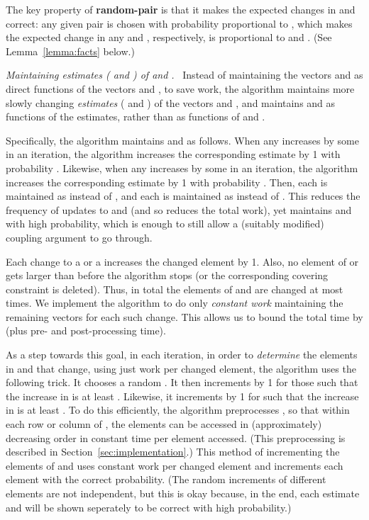 \documentclass[11pt]{svjour3} \usepackage{fullpage}
\renewcommand{\paragraph}[1]{\smallskip\vspace{2pt}\par{\em #1}~}
\begin{document}
The key property of {\bf random-pair} is that it makes
the expected changes in  and  correct:
any given pair  is chosen with probability proportional to
,
which makes the expected change in any  and ,
respectively, is proportional to  and .
(See Lemma~\ref{lemma:facts} below.)

\paragraph{Maintaining estimates ( and ) of  and .}
Instead of maintaining the vectors  and  as direct functions
of the vectors  and , 
to save work,
the algorithm maintains more slowly changing {\em estimates} ( and )
of the vectors  and ,
and maintains  and  as functions of the estimates,
rather than as functions of  and .

Specifically, the algorithm maintains  and  as follows.
When any  increases by some  in an iteration,
the algorithm increases the corresponding estimate  
by 1 with probability .
Likewise, when any  increases by some  in an iteration,
the algorithm increases the corresponding estimate  
by 1 with probability .
Then, each  is maintained as  instead of ,
and each  is maintained as  instead of .
This reduces the frequency of updates to  and  (and so reduces the total work),
yet maintains  and  
with high probability,
which is enough to still allow a (suitably modified) coupling argument to go through.

Each change to a  or a  increases the changed element by 1.
Also, no element of  or  gets larger than  before the algorithm stops 
(or the corresponding covering constraint is deleted).
Thus, in total the elements
of  and  are changed at most  times.
We implement the algorithm to do only {\em constant work} maintaining the remaining
vectors for each such change.
This allows us to bound the total time 
by  (plus  pre- and post-processing time).

As a step towards this goal, 
in each iteration, in order to {\em determine} the elements in  and  that
change, using just  work per changed element, the algorithm uses the following trick.
It chooses a random .
It then increments  by 1 for those  
such that the increase  in  is at least .
Likewise, it increments  by 1 for  such that the increase 
 in  is at least .
To do this efficiently, the algorithm preprocesses ,
so that within each row  or column  of ,
the elements can be accessed in (approximately) decreasing order
in constant time per element accessed.
(This preprocessing is described in Section~\ref{sec:implementation}.)
This method of incrementing the elements of  and  uses constant work per changed element and increments each element with the correct probability.
(The random increments of different elements are not independent,
but this is okay because, in the end, each estimate  and 
will be shown seperately to be correct with high probability.)
\end{document}

